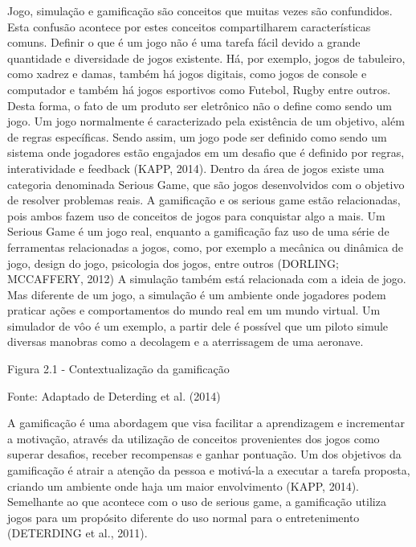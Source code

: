 \documentclass[
	12pt,				%
	oneside,			%
	a4paper,			%
	english,			%
	french,				%
	spanish,			%
	brazil,				%
	]{abntex2}
\begin{document}
	Jogo, simulação e gamificação são conceitos que muitas vezes são confundidos. Esta confusão acontece por estes conceitos compartilharem características comuns.
	Definir o que é um jogo não é uma tarefa fácil devido a grande quantidade e diversidade de jogos existente. Há, por exemplo, jogos de tabuleiro, como xadrez e damas, também há jogos digitais, como jogos de console e computador e também há jogos esportivos como Futebol, Rugby entre outros. Desta forma, o fato de um produto ser eletrônico não o define como sendo um jogo. Um jogo normalmente é caracterizado pela existência de um objetivo, além de regras específicas. Sendo assim, um jogo pode ser definido como sendo um sistema onde jogadores estão engajados em um desafio que é definido por regras, interatividade e feedback (KAPP, 2014). 
Dentro da área de jogos existe uma categoria denominada Serious Game, que são jogos desenvolvidos com o objetivo de resolver problemas reais. A gamificação e os serious game estão relacionadas, pois ambos fazem uso de conceitos de jogos para conquistar algo a mais. Um Serious Game é um jogo real, enquanto a gamificação faz uso de uma série de ferramentas relacionadas a jogos, como, por exemplo a mecânica ou dinâmica de jogo, design do jogo, psicologia dos jogos, entre outros (DORLING; MCCAFFERY, 2012)
A simulação também está relacionada com a ideia de jogo. Mas diferente de um jogo, a simulação é um ambiente onde jogadores podem praticar ações e comportamentos do mundo real em um mundo virtual. Um simulador de vôo é um exemplo, a partir dele é possível que um piloto simule diversas manobras como a decolagem e a aterrissagem de uma aeronave.

Figura 2.1 - Contextualização da gamificação 

Fonte: Adaptado de Deterding et al. (2014)

A gamificação é uma abordagem que visa facilitar a aprendizagem e incrementar a motivação, através da utilização de conceitos provenientes dos jogos como superar desafios, receber recompensas e ganhar pontuação. Um dos objetivos da gamificação é atrair a atenção da pessoa e motivá-la a executar a tarefa proposta, criando um ambiente onde haja um maior envolvimento (KAPP, 2014). Semelhante ao que acontece com o uso de serious game, a gamificação utiliza jogos para um propósito diferente do uso normal para o entretenimento (DETERDING et al., 2011).
\end{document}
